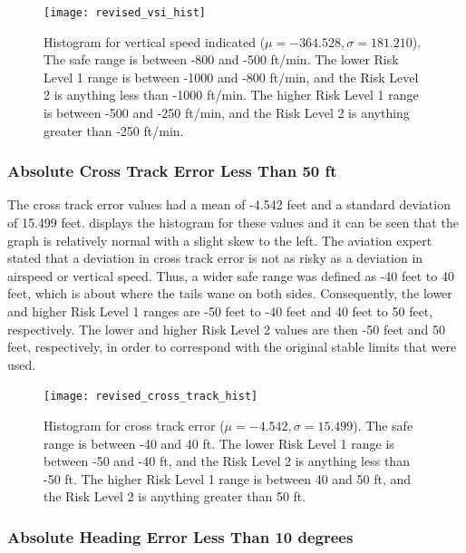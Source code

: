		\begin{figure}[t]
			\centering
            \texttt{[image: revised\_vsi\_hist]}
            \caption{Histogram for vertical speed indicated ($\mu = -364.528, \sigma = 181.210$).  The safe range is between -800 and -500 ft/min.  The lower Risk Level 1 range is between -1000 and -800 ft/min, and the Risk Level 2 is anything less than -1000 ft/min.  The higher Risk Level 1 range is between -500 and -250 ft/min, and the Risk Level 2 is anything greater than -250 ft/min.}
            \label{fig:revised_vsi_hist}
		\end{figure}



    \subsubsection{Absolute Cross Track Error Less Than 50 ft}
    
    	The cross track error values had a mean of -4.542 feet and a standard deviation of 15.499 feet.   displays the histogram for these values and it can be seen that the graph is relatively normal with a slight skew to the left.  The aviation expert stated that a deviation in cross track error is not as risky as a deviation in airspeed or vertical speed.  Thus, a wider safe range was defined as -40 feet to 40 feet, which is about where the tails wane on both sides.  Consequently, the lower and higher Risk Level 1 ranges are -50 feet to -40 feet and 40 feet to 50 feet, respectively.  The lower and higher Risk Level 2 values are then -50 feet and 50 feet, respectively, in order to correspond with the original stable limits that were used.
        
		\begin{figure}[t]
			\centering
            \texttt{[image: revised\_cross\_track\_hist]}
            \caption{Histogram for cross track error ($\mu = -4.542, \sigma = 15.499$).  The safe range is between -40 and 40 ft.  The lower Risk Level 1 range is between -50 and -40 ft, and the Risk Level 2 is anything less than -50 ft.  The higher Risk Level 1 range is between 40 and 50 ft, and the Risk Level 2 is anything greater than 50 ft.}
            \label{fig:revised_cross_track_hist}
		\end{figure}



    \subsubsection{Absolute Heading Error Less Than 10 degrees}
    
